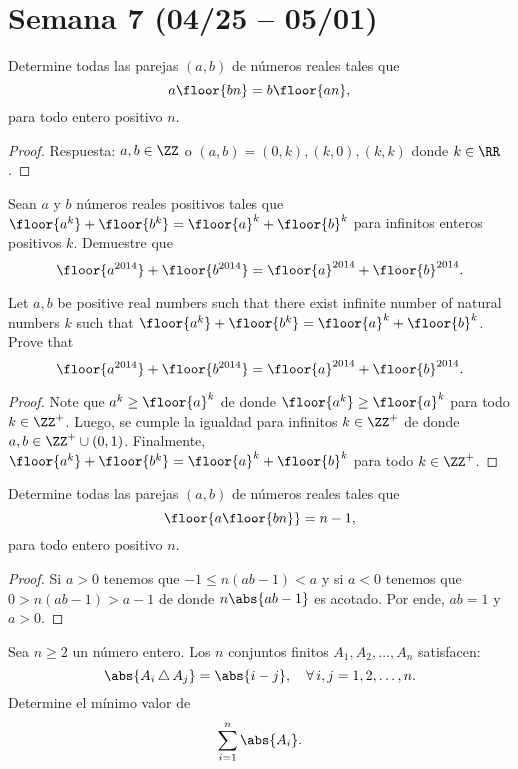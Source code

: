 \section{Semana 7 (04/25 -- 05/01)}


\begin{probEG}
	Determine todas las parejas $(a,b)$ de números reales tales que
	\[a\floor{bn}=b\floor{an},\]
	para todo entero positivo $n$.
\end{probEG}

\begin{proof}
	Respuesta: $a,b\in\ZZ$ o $(a,b)=(0,k),(k,0),(k,k)$ donde $k\in\RR$.
\end{proof}

\begin{probEG}[Indonesia MO SL 2014/A1]
	Sean $a$ y $b$ números reales positivos tales que $\floor{a^k}+\floor{b^k}=\floor{a}^k+\floor{b}^k$ para infinitos enteros positivos $k$. Demuestre que
	\[\floor{a^{2014}}+\floor{b^{2014}}=\floor{a}^{2014}+\floor{b}^{2014}.\]
	\begin{hint}
		Let $a,b$ be positive real numbers such that there exist infinite number of natural numbers $k$ such that $\floor{a^k}+\floor{b^k}=\floor{a}^k+\floor{b}^k$. Prove that
		\[\floor{a^{2014}}+\floor{b^{2014}}=\floor{a}^{2014}+\floor{b}^{2014}.\]
	\end{hint}
\end{probEG}

\begin{proof}
	Note que $a^k\ge\floor{a}^k$ de donde $\floor{a^k}\ge\floor{a}^k$ para todo $k\in\ZZ^+$. Luego, se cumple la igualdad para infinitos $k\in\ZZ^+$ de donde $a,b\in\ZZ^+\cup(0,1)$. Finalmente, $\floor{a^k}+\floor{b^k}=\floor{a}^k+\floor{b}^k$ para todo $k\in\ZZ^+$.
\end{proof}

\begin{probEG}
	Determine todas las parejas $(a,b)$ de números reales tales que
	\[\floor{a\floor{bn}}=n-1,\]
	para todo entero positivo $n$.
\end{probEG}

\begin{proof}
	Si $a>0$ tenemos que $-1\le n(ab-1)<a$ y si $a<0$ tenemos que $0>n(ab-1)>a-1$ de donde $n\abs{ab-1}$ es acotado. Por ende, $ab=1$ y $a>0$.
\end{proof}

\begin{probMG}
	Sea $n\ge 2$ un número entero. Los $n$ conjuntos finitos $A_1,A_2,\dots,A_n$ satisfacen:
	\[\abs{A_i\,\triangle\,A_j}=\abs{i-j},\quad\forall\,i,j=1,2,\dots,n.\]
	Determine el mínimo valor de
	\[\sum_{i=1}^n\abs{A_i}.\]
\end{probMG}

